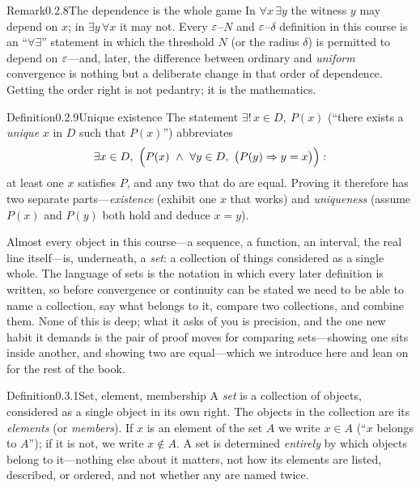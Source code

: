 \documentclass[main.tex]{subfiles}
\begin{document}
\begin{ObjL}{Remark}{0.2.8}{The dependence is the whole game}
In $\forall x\,\exists y$ the witness $y$ may depend on $x$; in $\exists y\,\forall x$ it may not.
Every $\varepsilon$--$N$ and $\varepsilon$--$\delta$ definition in this course is an ``$\forall\exists$'' statement
in which the threshold $N$ (or the radius $\delta$) is permitted to depend on $\varepsilon$---and, later, the
difference between ordinary and \emph{uniform} convergence is nothing but a deliberate change in that
order of dependence. Getting the order right is not pedantry; it is the mathematics.
\end{ObjL}

\begin{Obj}{Definition}{0.2.9}{Unique existence}
The statement $\exists!\,x\in D,\ P(x)$ (``there exists a \emph{unique} $x$ in $D$ such that
$P(x)$'') abbreviates
\[
\exists x\in D,\ \Bigl(P(x)\ \wedge\ \forall y\in D,\ \bigl(P(y)\Rightarrow y=x\bigr)\Bigr):
\]
at least one $x$ satisfies $P$, and any two that do are equal. Proving it therefore has two separate
parts---\emph{existence} (exhibit one $x$ that works) and \emph{uniqueness} (assume $P(x)$ and $P(y)$
both hold and deduce $x=y$).
\end{Obj}

\clearpage

\noindent Almost every object in this course---a sequence, a function, an interval, the real line
itself---is, underneath, a \emph{set}: a collection of things considered as a single whole. The
language of sets is the notation in which every later definition is written, so before convergence or
continuity can be stated we need to be able to name a collection, say what belongs to it, compare two
collections, and combine them. None of this is deep; what it asks of you is precision, and the one
new habit it demands is the pair of proof moves for comparing sets---showing one sits inside another,
and showing two are equal---which we introduce here and lean on for the rest of the book.

\begin{Obj}{Definition}{0.3.1}{Set, element, membership}
A \emph{set} is a collection of objects, considered as a single object in its own right. The objects
in the collection are its \emph{elements} (or \emph{members}). If $x$ is an element of the set $A$ we
write $x\in A$ (``$x$ belongs to $A$''); if it is not, we write $x\notin A$. A set is determined
\emph{entirely} by which objects belong to it---nothing else about it matters, not how its elements
are listed, described, or ordered, and not whether any are named twice.
\end{Obj}
\end{document}
